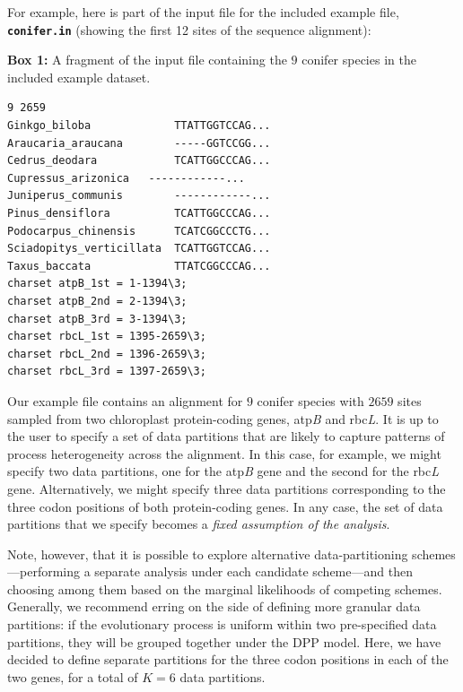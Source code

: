 \documentclass[11pt]{article}
\newcommand{\cl}[1]{{\texttt{\textbf{#1}}}}
\begin{document}
For example, here is part of the input file for the included example file, \cl{conifer.in}  (showing the first 12 sites of the sequence alignment):
\begin{center}
{\bf Box 1:} A fragment of the input file containing the $9$ conifer species in the included example dataset. \\
\end{center}
{\tt \scriptsize \begin{framed}
\begin{lstlisting}
9 2659
Ginkgo_biloba             TTATTGGTCCAG...
Araucaria_araucana        -----GGTCCGG...
Cedrus_deodara            TCATTGGCCCAG...
Cupressus_arizonica	  ------------...
Juniperus_communis        ------------...
Pinus_densiflora          TCATTGGCCCAG...
Podocarpus_chinensis      TCATCGGCCCTG...
Sciadopitys_verticillata  TCATTGGTCCAG...
Taxus_baccata             TTATCGGCCCAG...
charset atpB_1st = 1-1394\3;
charset atpB_2nd = 2-1394\3;
charset atpB_3rd = 3-1394\3;
charset rbcL_1st = 1395-2659\3;
charset rbcL_2nd = 1396-2659\3;
charset rbcL_3rd = 1397-2659\3;
\end{lstlisting}
\end{framed}}

\bigskip
Our example file contains an alignment for $9$ conifer species with $2659$ sites sampled from two chloroplast protein-coding genes, atp\emph{B} and rbc\emph{L}.
It is up to the user to specify a set of data partitions that are likely to capture patterns of process heterogeneity across the alignment.
In this case, for example, we might specify two data partitions, one for the atp\emph{B} gene and the second for the rbc\emph{L} gene.
Alternatively, we might specify three data partitions corresponding to the three codon positions of both protein-coding genes.
In any case, the set of data partitions that we specify becomes a \emph{fixed assumption of the analysis}.

Note, however, that it is possible to explore alternative data-partitioning schemes---performing a separate analysis under each candidate scheme---and then choosing among them based on the marginal likelihoods of competing schemes.   
Generally, we recommend erring on the side of defining more granular data partitions: if the evolutionary process is uniform within two pre-specified data partitions, they will be grouped together under the DPP model.
Here, we have decided to define separate partitions for the three codon positions in each of the two genes, for a total of $K = 6$ data partitions.
\end{document}
